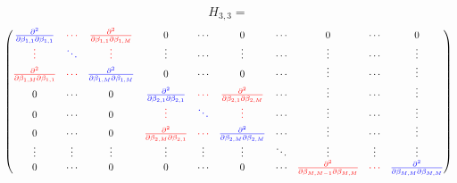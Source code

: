 $$ H_{3,3} = $$
\begin{equation}
\begin{pmatrix}
\textcolor{blue}{\frac{\partial^2 } {\partial \beta_{1,1} \partial \beta_{1,1} }          } 
&
 \textcolor{red}{\cdots }
& 
 \textcolor{red}{\frac{\partial^2 }{\partial \beta_{1,1} \partial \beta_{1,M} } } 
&
0 & \cdots & 0 & 
\cdots & 0 & 
 \cdots 
&
  0      
\\%
\textcolor{red}{\vdots  }     &  \textcolor{blue}{\ddots }  & \textcolor{red}{\vdots} & \vdots & \cdots & \vdots   & \cdots & \vdots & \cdots & \vdots  
\\%
\textcolor{red}{\frac{\partial^2 }{\partial \beta_{1,M} \partial \beta_{1,1} } } & 
\textcolor{red}{\cdots}  & 
\textcolor{blue}{\frac{\partial^2 }{\partial \beta_{1,M} \partial \beta_{1,M} }} & 
 0 & \cdots & 0 & \cdots   & \vdots & \cdots & \vdots     
\\%
0  & 
\cdots & 0 & 
\textcolor{blue}{\frac{\partial^2 } {\partial \beta_{2,1} \partial \beta_{2,1} }} &
\textcolor{red}{\cdots} & 
\textcolor{red}{\frac{\partial^2 } {\partial \beta_{2,1} \partial \beta_{2,M} }}      & 
\cdots & \vdots & \cdots & \vdots
\\%
0  & 
\cdots & 0 & 
\textcolor{red}{\vdots} &
\textcolor{blue}{\ddots }& 
\textcolor{red}{\vdots } & 
\cdots & \vdots & \cdots & \vdots
\\ %
0 &
\cdots & 0 & 
\textcolor{red}{\frac{\partial^2 } {\partial \beta_{2,M} \partial \beta_{2,1} }} &
\textcolor{red}{\cdots} & 
\textcolor{blue}{\frac{\partial^2 } {\partial \beta_{2,M} \partial \beta_{2,M} }}      & 
\cdots & \vdots & \cdots & \vdots
\\ %
\vdots    &
\vdots & 
\vdots      & 
\vdots & \vdots & \vdots & \ddots &
\vdots & 
\vdots & 
\vdots
\\ %
0      & 
\cdots & 
0      & 
0 & 
\cdots & 
0  & \cdots &
\textcolor{red}{\frac{\partial^2 } {\partial \beta_{M,M-1} \partial \beta_{M,M} }} &
\textcolor{red}{\cdots} & 
\textcolor{blue}{\frac{\partial^2 } {\partial \beta_{M,M} \partial \beta_{M,M} }}
\end{pmatrix}
\end{equation}


